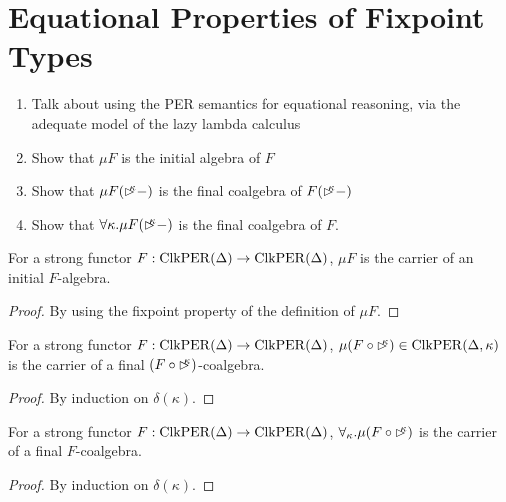 \section{Equational Properties of Fixpoint Types}
\label{sec:fixpoint-types}

\begin{enumerate}
\item Talk about using the PER semantics for equational reasoning, via
  the adequate model of the lazy lambda calculus
\item Show that $\mu F$ is the initial algebra of $F$
\item Show that $\mu F(\mathord{\rhd\kern-0.4em^{\kappa}}-)$ is the final coalgebra of $F(\mathord{\rhd\kern-0.4em^{\kappa}} -)$
\item Show that $\forall \kappa. \mu F(\mathord{\rhd\kern-0.4em^{\kappa}} -)$ is the final
  coalgebra of $F$.
\end{enumerate}

\begin{theorem}\label{thm:initial-f-algebra}
  For a strong functor $F : \mathrm{ClkPER}(\Delta) \to \mathrm{ClkPER}(\Delta)$, $\mu
  F$ is the carrier of an initial $F$-algebra.
\end{theorem}

\begin{proof}
  By using the fixpoint property of the definition of $\mu F$.
\end{proof}

\begin{theorem}\label{thm:final-f-de-coalgebra}
  For a strong functor $F : \mathrm{ClkPER}(\Delta) \to \mathrm{ClkPER}(\Delta)$, $\mu
  (F \circ \mathord{\rhd\kern-0.4em^{\kappa}}) \in \mathrm{ClkPER}(\Delta,\kappa)$ is the carrier of a final $(F \circ
  \mathord{\rhd\kern-0.4em^{\kappa}})$-coalgebra.
\end{theorem}

\begin{proof}
  By induction on $\delta(\kappa)$.
\end{proof}

\begin{theorem}\label{thm:final-f-coalgebra}
  For a strong functor $F : \mathrm{ClkPER}(\Delta) \to \mathrm{ClkPER}(\Delta)$,
  $\forall_\kappa. \mu (F \circ \mathord{\rhd\kern-0.4em^{\kappa}})$ is the carrier of a
  final $F$-coalgebra.
\end{theorem}

\begin{proof}
  By induction on $\delta(\kappa)$.
\end{proof}

